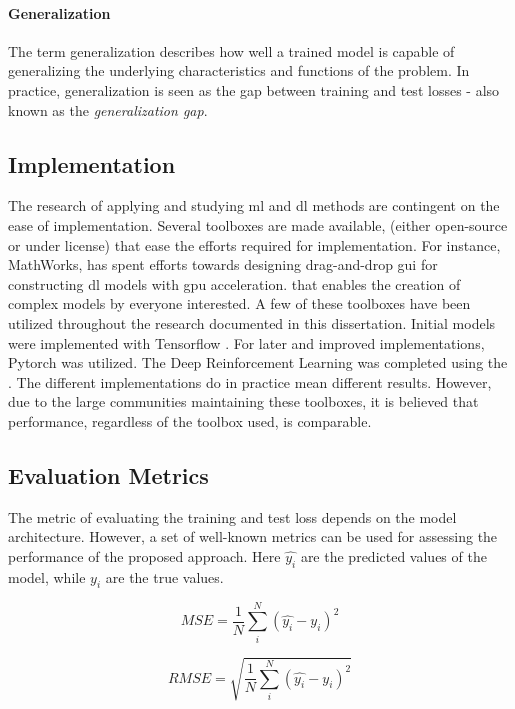 \paragraph{Generalization}
The term generalization describes how well a trained model is capable of generalizing the underlying characteristics and functions of the problem. In practice, generalization is seen as the gap between training and test losses - also known as the \emph{generalization gap}. 

\subsection{Implementation}
The research of applying and studying \gls{ml} and \gls{dl} methods are contingent on the ease of implementation. Several toolboxes are made available, (either open-source or under license) that ease the efforts required for implementation. For instance, MathWorks, has spent efforts towards designing drag-and-drop \gls{gui} for constructing \gls{dl} models with \gls{gpu} acceleration. that enables the creation of complex models by everyone interested. A few of these toolboxes have been utilized throughout the research documented in this dissertation. Initial models were implemented with Tensorflow \cite{tensorflow2015-whitepaper}. For later and improved implementations, Pytorch \cite{Paszke2017AutomaticPyTorch} was utilized. The Deep Reinforcement Learning was completed using the \cite{MATLABRL_toolbox}. The different implementations do in practice mean different results. However, due to the large communities maintaining these toolboxes, it is believed that performance, regardless of the toolbox used, is comparable. 

\subsection{Evaluation Metrics}\label{subsec:eval_metrics}
The metric of evaluating the training and test loss depends on the model architecture. However, a set of well-known metrics can be used for assessing the performance of the proposed approach. Here $\hat{y_i}$ are the predicted values of the model, while $y_i$ are the true values.

\begin{equation}
    MSE =  \frac{1}{N} \sum_i^N (\hat{y_i} - y_i)^2
\end{equation}

\begin{equation}\label{eq:rmse}
    RMSE = \sqrt{\frac{1}{N} \sum_i^N (\hat{y_i} - y_i)^2}
\end{equation}

